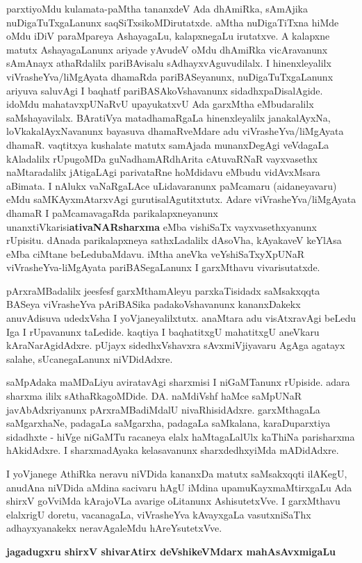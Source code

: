 parxtiyoMdu kulamata-paMtha tananxdeV Ada dhAmiRka, sAmAjika nuDigaTuTxgaLanunx saqSiTxsikoMDirutatxde. aMtha nuDigaTiTxna hiMde oMdu iDiV paraMpareya AshayagaLu, kalapxnegaLu irutatxve. A kalapxne matutx AshayagaLanunx ariyade yAvudeV oMdu dhAmiRka vicAravanunx sAmAnayx athaRdalilx pariBAvisalu sAdhayxvAguvudilalx. I hinenxleyalilx viVrasheYva/liMgAyata dhamaRda pariBASe\-yanunx, nuDigaTuTxgaLanunx ariyuva saluvAgi I baqhatf pariBASAkoVshavanunx sidadhxpaDisalAgide. idoMdu mahatavxpUNaRvU upayukatxvU Ada garxMtha eMbudaralilx saMshayavilalx. BAratiVya matadhamaRgaLa hinenxleyalilx janakalAyxNa, loVkakalAyxNa\-vanunx bayasuva dhamaRveMdare adu viVrasheYva/liMgAyata dhamaR. vaqtitxya kushalate matutx samAjada munanxDegAgi veVdagaLa kAladalilx rUpugoMDa guNadhamARdhArita cAtuvaRNaR vayxvasethx naMtaradalilx jAtigaLAgi parivataRne hoMdidavu eMbudu \hbox{vidAvxMsara} aBimata. I nAlukx vaNaRgaLAce uLidavaranunx paMcamaru (aidaneyavaru) eMdu saMKAyxmAtarxvAgi gurutisalAgutitxtutx. Adare viVrasheYva/liMgAyata dhamaR I paMcamavagaRda parikalapxneyanunx unanxtiVkarisi\break \textbf{ativaNARsharxma} eMba vishiSaTx vayxvasethxyanunx rUpisitu. dAnada parikalapxneya sathxLadalilx dAsoVha, kAyakaveV keYlAsa eMba ciMtane beLedubaMdavu. iMtha aneVka veYshiSaTxyXpUNaR viVrasheYva-liMgAyata pariBASegaLanunx I garxMthavu vivarisutatxde.

\medskip

pArxraMBadalilx jeesfesf garxMthamAleyu parxkaTisidadx saMsakxqqta BASeya viVrasheYva pAriBASika padakoVshavanunx kananxDakekx anuvAdisuva udedxVsha I yoVjaneyalilxtutx. anaMtara adu visAtxravAgi beLedu Iga I rUpavanunx taLedide. kaqtiya I baqhatitxgU mahatitxgU aneVkaru kAraNarAgidAdxre. pUjayx sidedhxVshavxra sAvxmiVjiyavaru AgAga agatayx salahe, sUcanegaLanunx niVDidAdxre.

\medskip

saMpAdaka maMDaLiyu aviratavAgi sharxmisi I niGaMTanunx rUpiside. adara sharxma ililx sAthaRkagoMDide. DA. naMdiVshf haMce saMpUNaR javAbAdxriyanunx pArxraMBadiMdalU nivaRhisidAdxre. garxMthagaLa saMgarxhaNe, padagaLa saMgarxha, padagaLa saMkalana, karaDuparxtiya sidadhxte - hiVge niGaMTu racaneya elalx haMtagaLalUlx kaThiNa parisharxma hAkidAdxre. I sharxmadAyaka kelasavanunx sharxdedhxyiMda mADidAdxre. 
\medskip

I yoVjanege AthiRka neravu niVDida kananxDa matutx saMsakxqqti ilAKegU, anudAna niVDida aMdina sacivaru hAgU iMdina upamuKayxmaMtirxgaLu Ada shirxV goVviMda kArajoVLa avarige oLitanunx AshisutetxVve. I garxMthavu elalxrigU doretu, vacanagaLa, viVrasheYva kAvayxgaLa vasutxniSaThx adhayxyanakekx neravAgaleMdu hAreYsutetxVve.

\vskip 1cm

\hfill {\large\bf jagadugxru shirxV shivarAtirx deVshikeVMdarx mahAsAvxmigaLu}
